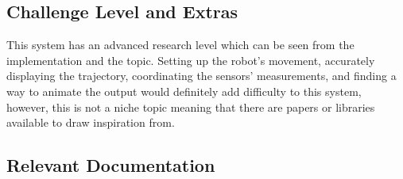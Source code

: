 \documentclass[12pt, titlepage]{article}
\begin{document}

\subsection{Challenge Level and Extras}

This system has an advanced research level which can be seen from the implementation and the topic. Setting up the robot's movement, accurately displaying the trajectory, coordinating the sensors' measurements, and finding a way to animate the output would definitely add difficulty to this system, however, this is not a niche topic meaning that there are papers or libraries available to draw inspiration from.



\subsection{Relevant Documentation}

\end{document}
